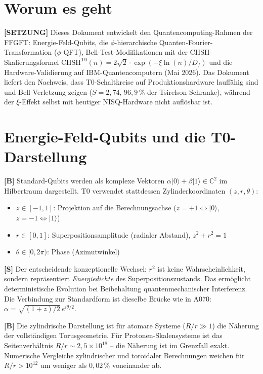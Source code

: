 \section{Worum es geht}

\textbf{[SETZUNG]} Dieses Dokument entwickelt den Quantencomputing-Rahmen der
FFGFT: Energie-Feld-Qubits, die $\phi$-hierarchische Quanten-Fourier-Transformation
($\phi$-QFT), Bell-Test-Modifikationen mit der CHSH-Skalierungsformel
$\text{CHSH}^{\text{T0}}(n) = 2\sqrt{2}\cdot\exp(-\xi\ln(n)/D_f)$ und die
Hardware-Validierung auf IBM-Quantencomputern (Mai 2026). Das Dokument liefert
den Nachweis, dass T0-Schaltkreise auf Produktionshardware lauffähig sind und
Bell-Verletzung zeigen ($S=2{,}74$, $96{,}9\,\%$ der Tsirelson-Schranke), während
der $\xi$-Effekt selbst mit heutiger NISQ-Hardware nicht auflösbar ist.

\section{Energie-Feld-Qubits und die T0-Darstellung}

\textbf{[B]} Standard-Qubits werden als komplexe Vektoren
$\alpha|0\rangle+\beta|1\rangle\in\mathbb{C}^2$ im Hilbertraum dargestellt. T0
verwendet stattdessen Zylinderkoordinaten $(z,r,\theta)$:

\begin{itemize}[leftmargin=2em,itemsep=2pt,topsep=2pt]
  \item $z\in[-1,1]$: Projektion auf die Berechnungsachse ($z=+1
        \Leftrightarrow|0\rangle$, $z=-1\Leftrightarrow|1\rangle$)
  \item $r\in[0,1]$: Superpositionsamplitude (radialer Abstand), $z^2+r^2=1$
  \item $\theta\in[0,2\pi)$: Phase (Azimutwinkel)
\end{itemize}

\textbf{[S]} Der entscheidende konzeptionelle Wechsel: $r^2$ ist keine
Wahrscheinlichkeit, sondern repräsentiert \emph{Energiedichte} des
Superpositionszustands. Das ermöglicht deterministische Evolution bei
Beibehaltung quantenmechanischer Interferenz. Die Verbindung zur Standardform ist
dieselbe Brücke wie in A070: $\alpha=\sqrt{(1+z)/2}\,e^{i\theta/2}$.

\textbf{[B]} Die zylindrische Darstellung ist für atomare Systeme ($R/r\gg1$) die
Näherung der vollständigen Torusgeometrie. Für Protonen-Skalensysteme ist das
Seitenverhältnis $R/r\sim2{,}5\times10^{18}$ -- die Näherung ist im Grenzfall
exakt. Numerische Vergleiche zylindrischer und toroidaler Berechnungen weichen
für $R/r>10^{12}$ um weniger als $0{,}02\,\%$ voneinander ab.


